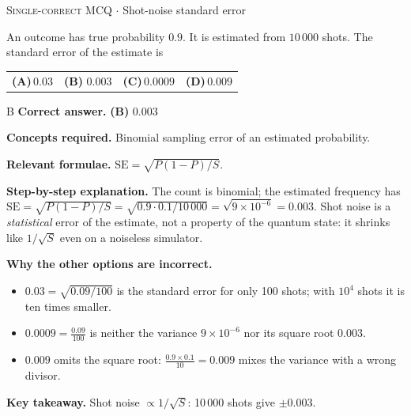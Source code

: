 \documentclass[11pt,a4paper]{article}
\newcommand{\optlabel}[1]{\textbf{(#1)}}
\newcommand{\correctlabel}[1]{\textcolor{okgreen}{\textbf{(#1)}\,\ding{51}}}
\newenvironment{qitem}[1]{\begin{list}{}{\setlength{\leftmargin}{3.3em}\setlength{\labelwidth}{3.1em}%
  \setlength{\labelsep}{0.2em}\setlength{\topsep}{3pt}\setlength{\parsep}{3pt}}\item[\textbf{Q.#1}\hfill]}{\end{list}}
\newcommand{\qsep}{\par\vspace{2pt}{\color{black!15}\hrule}\vspace{4pt}}
\newcommand{\qmeta}[2]{{\footnotesize\color{black!60}\textsc{#1} \;$\cdot$\; #2}\par}
\begin{document}
\begin{qitem}{8}
\qmeta{Single-correct MCQ}{Shot-noise standard error}
An outcome has true probability $0.9$. It is estimated from $10\,000$ shots. The standard error of the estimate is
\par\smallskip\noindent\begin{tabularx}{\linewidth}{@{}*{4}{L}@{}}
\optlabel{A}\,$0.03$ & \correctlabel{B}\,$0.003$ & \optlabel{C}\,$0.0009$ & \optlabel{D}\,$0.009$
\end{tabularx}
\end{qitem}
\begin{solbox}{B}
\textbf{\color{brand}Correct answer.} \textcolor{okgreen}{\textbf{(B)}} $0.003$

\textbf{\color{brand}Concepts required.} Binomial sampling error of an estimated probability.

\textbf{\color{brand}Relevant formulae.} $\mathrm{SE} = \sqrt{P(1-P)/S}$.

\textbf{\color{brand}Step-by-step explanation.} The count is binomial; the estimated frequency has $\mathrm{SE} = \sqrt{P(1 - P)/S} = \sqrt{0.9\cdot0.1/10\,000} = \sqrt{9\times10^{-6}} = 0.003$.
Shot noise is a \emph{statistical} error of the estimate, not a property of the quantum state: it shrinks like $1/\sqrt S$ even on a noiseless simulator.

\textbf{\color{brand}Why the other options are incorrect.}
\begin{itemize}[leftmargin=2.4em, itemsep=1pt, topsep=2pt]
\item[\textbf{(A)}] $0.03 = \sqrt{0.09/100}$ is the standard error for only 100 shots; with $10^4$ shots it is ten times smaller.
\item[\textbf{(C)}] $0.0009 = \frac{0.09}{100}$ is neither the variance $9\times10^{-6}$ nor its square root $0.003$.
\item[\textbf{(D)}] $0.009$ omits the square root: $\frac{0.9\times0.1}{10} = 0.009$ mixes the variance with a wrong divisor.
\end{itemize}
\textbf{\color{brand}Key takeaway.} Shot noise $\propto 1/\sqrt S$: 10\,000 shots give $\pm0.003$.
\end{solbox}
\qsep
\end{document}
